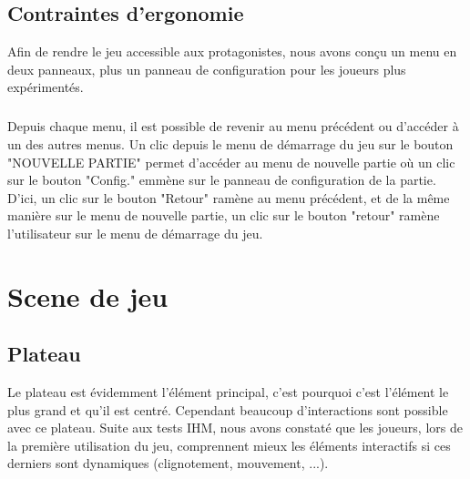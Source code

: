 \documentclass{report}
\begin{document}
 \section{ Contraintes d'ergonomie }
 
 Afin de rendre le jeu accessible aux protagonistes, nous avons conçu un menu en deux panneaux, plus un panneau de configuration pour les joueurs plus expérimentés.
 
 \paragraph{}
 Depuis chaque menu, il est possible de revenir au menu précédent ou d'accéder à un des autres menus. Un clic depuis le menu de démarrage du jeu sur le bouton "NOUVELLE PARTIE" permet d'accéder au menu de nouvelle partie où un clic sur le bouton "Config." emmène sur le panneau de configuration de la partie. D'ici, un clic sur le bouton "Retour" ramène au menu précédent, et de la même manière sur le menu de nouvelle partie, un clic sur le bouton "retour" ramène l'utilisateur sur le menu de démarrage du jeu.


\chapter{Scene de jeu}
\section{Plateau}
Le plateau est évidemment l'élément principal, c'est pourquoi c'est l'élément le plus grand et qu'il est centré. Cependant beaucoup d’interactions sont possible avec ce plateau. Suite aux tests IHM,
nous avons constaté que les joueurs, lors de la première utilisation du jeu, comprennent mieux les éléments interactifs si ces derniers sont dynamiques (clignotement, mouvement, ...).
\end{document}
